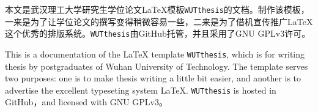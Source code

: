 
\begin{WUTChineseabstract}
\par 本文是武汉理工大学研究生学位论文{\LaTeX}模板\texttt{WUTthesis}的文档。制作该模板，一来是为了让学位论文的撰写变得稍微容易一些，二来是为了借机宣传推广{\LaTeX}这个优秀的排版系统。\texttt{WUTthesis}由GitHub托管，并且采用了GNU GPLv3许可。
\end{WUTChineseabstract}



















\begin{WUTEnglishabstract}
\par This is a documentation of the {\LaTeX} template \texttt{WUTthesis}, which is for writing thesis by postgraduates of Wuhan University of Technology. The template serves two purposes: one is to make thesis writing a little bit easier, and another is to advertise the excellent typeseting system {\LaTeX}. \texttt{WUTthesis} is hosted in GitHub，and licensed with GNU GPLv3。
\end{WUTEnglishabstract}









